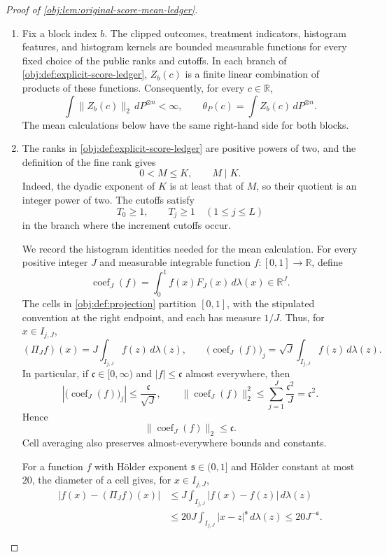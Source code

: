 \begin{proof}[Proof of \cref{obj:lem:original-score-mean-ledger}]
\begin{enumerate}
\item
Fix a block index \(b\). The clipped outcomes, treatment indicators, histogram features, and histogram kernels are bounded measurable functions for every fixed choice of the public ranks and cutoffs. In each branch of \cref{obj:def:explicit-score-ledger}, \(Z_b(c)\) is a finite linear combination of products of these functions. Consequently, for every \(c\in\mathbb R\),
\[
\int \|Z_b(c)\|_2\,dP^{\otimes n}<\infty,
\qquad
\theta_P(c)=\int Z_b(c)\,dP^{\otimes n}.
\]
The mean calculations below have the same right-hand side for both blocks.

\item
The ranks in \cref{obj:def:explicit-score-ledger} are positive powers of two, and the definition of the fine rank gives
\[
0<M\le K,\qquad M\mid K.
\]
Indeed, the dyadic exponent of \(K\) is at least that of \(M\), so their quotient is an integer power of two. The cutoffs satisfy
\[
T_0\ge1,\qquad T_j\ge1\quad(1\le j\le L)
\]
in the branch where the increment cutoffs occur.

We record the histogram identities needed for the mean calculation. For every positive integer \(J\) and measurable integrable function \(f:[0,1]\to\mathbb R\), define
\[
\operatorname{coef}_J(f)
=
\int_0^1 f(x)F_J(x)\,d\lambda(x)\in\mathbb R^J.
\]
The cells in \cref{obj:def:projection} partition \([0,1]\), with the stipulated convention at the right endpoint, and each has measure \(1/J\). Thus, for \(x\in I_{j,J}\),
\[
(\Pi_J f)(x)=J\int_{I_{j,J}}f(z)\,d\lambda(z),
\qquad
\bigl(\operatorname{coef}_J(f)\bigr)_j
=
\sqrt J\int_{I_{j,J}}f(z)\,d\lambda(z).
\]
In particular, if \(\mathfrak c\in[0,\infty)\) and \(|f|\le\mathfrak c\) almost everywhere, then
\[
\left|\bigl(\operatorname{coef}_J(f)\bigr)_j\right|
\le\frac{\mathfrak c}{\sqrt J},
\qquad
\|\operatorname{coef}_J(f)\|_2^2
\le\sum_{j=1}^J\frac{\mathfrak c^2}{J}
=\mathfrak c^2.
\]
Hence
\[
\|\operatorname{coef}_J(f)\|_2\le\mathfrak c.
\]
Cell averaging also preserves almost-everywhere bounds and constants.

For a function \(f\) with Hölder exponent \(\mathfrak s\in(0,1]\) and Hölder constant at most \(20\), the diameter of a cell gives, for \(x\in I_{j,J}\),
\[
\begin{aligned}
|f(x)-(\Pi_Jf)(x)|
&\le J\int_{I_{j,J}}|f(x)-f(z)|\,d\lambda(z)\\
&\le20J\int_{I_{j,J}}|x-z|^{\mathfrak s}\,d\lambda(z)
\le20J^{-\mathfrak s}.
\end{aligned}
\]


\end{enumerate}
\end{proof}
